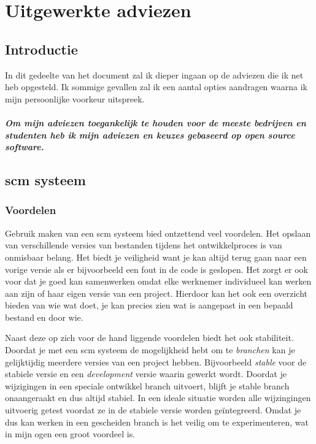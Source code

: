 \chapter{Uitgewerkte adviezen}

\section{Introductie}

In dit gedeelte van het document zal ik dieper ingaan op de adviezen die ik net heb opgesteld. Ik sommige gevallen zal ik een aantal opties aandragen waarna ik mijn persoonlijke voorkeur uitspreek.

\paragraph{Om mijn adviezen toegankelijk te houden voor de meeste bedrijven en studenten heb ik mijn adviezen en keuzes gebaseerd op open source software.}

\section{{\sc scm} systeem}

\subsection{Voordelen}

Gebruik maken van een {\sc scm} systeem bied ontzettend veel voordelen. Het opslaan van verschillende versies van bestanden tijdens het ontwikkelproces is van onmisbaar belang. Het biedt je veiligheid want je kan altijd terug gaan naar een vorige versie als er bijvoorbeeld een fout in de code is geslopen. Het zorgt er ook voor dat je goed kan samenwerken omdat elke werknemer individueel kan werken aan zijn of haar eigen versie van een project. Hierdoor kan het ook een overzicht bieden van wie wat doet, je kan precies zien wat is aangepast in een bepaald bestand en door wie.

Naast deze op zich voor de hand liggende voordelen biedt het ook stabiliteit. Doordat je met een {\sc scm} systeem de mogelijkheid hebt om te \emph{branchen} kan je gelijktijdig meerdere versies van een project hebben. Bijvoorbeeld \emph{stable} voor de stabiele versie en een \emph{development} versie waarin gewerkt wordt. Doordat je wijzigingen in een speciale ontwikkel branch uitvoert, blijft je stable branch onaangeraakt en dus altijd stabiel. In een ideale situatie worden alle wijzingingen uitvoerig getest voordat ze in de stabiele versie worden geïntegreerd. Omdat je dus kan werken in een gescheiden branch is het veilig om te experimenteren, wat in mijn ogen een groot voordeel is.

